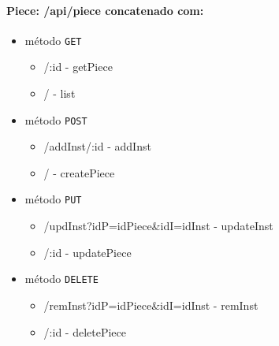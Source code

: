 \paragraph{Piece: /api/piece concatenado com:}
        \begin{itemize}
            \item método \texttt{GET}
                \begin{itemize}
                    \item /:id - getPiece
                    \item / - list
                \end{itemize}
            \item método \texttt{POST}
                \begin{itemize}
                    \item /addInst/:id - addInst
                    \item / - createPiece
                \end{itemize}
            \item método \texttt{PUT}
                \begin{itemize}
                    \item /updInst?idP=idPiece\&idI=idInst - updateInst
                    \item /:id - updatePiece
                \end{itemize}
            \item método \texttt{DELETE}
                \begin{itemize}
                    \item /remInst?idP=idPiece\&idI=idInst - remInst
                    \item /:id - deletePiece
                \end{itemize}
        \end{itemize}


